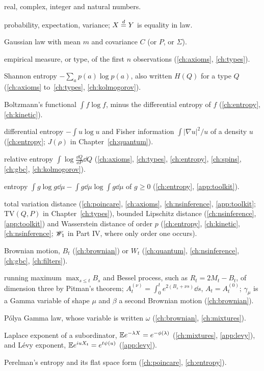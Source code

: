 \begin{description}[leftmargin=2.2em,labelwidth=1.8em,labelsep=0.4em,itemsep=0pt,parsep=0pt]
\item[$\R,\C,\Z,\N$] real, complex, integer and natural numbers.
\item[$\P,\E,\Var$] probability, expectation, variance; $X\stackrel{d}{=} Y$ is equality in law.
\item[$N(m,C)$] Gaussian law with mean $m$ and covariance $C$ (or $P$, or $\Sigma$).
\item[$L_n$] empirical measure, or type, of the first $n$ observations (\ref{ch:axioms}, \ref{ch:types}).
\item[$H(p)$] Shannon entropy $-\sum_ap(a)\log p(a)$, also written $H(Q)$ for a type $Q$ (\ref{ch:axioms} to~\ref{ch:types}, \ref{ch:kolmogorov}).
\item[$H(f)$] Boltzmann's functional $\int f\log f$, minus the differential entropy of $f$ (\ref{ch:entropy}, \ref{ch:kinetic}).
\item[$h(u),\ J(u)$] differential entropy $-\int u\log u$ and Fisher information $\int|\nabla u|^2/u$ of a density $u$ (\ref{ch:entropy}; $J(\rho)$ in Chapter~\ref{ch:quantum}).
\item[$\KL(Q\|P)$] relative entropy $\int\log\frac{\dd Q}{\dd P}\dd Q$ (\ref{ch:axioms}, \ref{ch:types}, \ref{ch:entropy}, \ref{ch:spins}, \ref{ch:gbc}, \ref{ch:kolmogorov}).
\item[$\Ent_\mu(g)$] entropy $\int g\log g\dd\mu-\int g\dd\mu\log\int g\dd\mu$ of $g\ge0$ (\ref{ch:entropy}, \ref{app:toolkit}).
\item[$\mathrm{TV},\ d_{BL},\ W_p$] total variation distance (\ref{ch:poincare}, \ref{ch:axioms}, \ref{ch:nsinference}, \ref{app:toolkit}; $\mathrm{TV}(Q,P)$ in Chapter~\ref{ch:types}), bounded Lipschitz distance (\ref{ch:nsinference}, \ref{app:toolkit}) and Wasserstein distance of order $p$ (\ref{ch:entropy}, \ref{ch:kinetic}, \ref{ch:nsinference}; $\mathscr{W}_1$ in Part IV, where only order one occurs).
\item[$B_t,\ W_t$] Brownian motion, $B_t$ (\ref{ch:brownian}) or $W_t$ (\ref{ch:quantum}, \ref{ch:nsinference}, \ref{ch:gbc}, \ref{ch:filters}).
\item[$M_t,\ R_t$] running maximum $\max_{s\le t}B_s$ and Bessel process, such as $R_t=2M_t-B_t$, of dimension three by Pitman's theorem; $A^{(\nu)}_t=\int_0^te^{2(B_s+\nu s)}\dd s$, $A_t=A^{(0)}_t$; $\gamma_\mu$ is a Gamma variable of shape $\mu$ and $\beta$ a second Brownian motion (\ref{ch:brownian}).
\item[$PG(b,c)$] P\'olya Gamma law, whose variable is written $\omega$ (\ref{ch:brownian}, \ref{ch:mixtures}).
\item[$\phi,\ \psi$] Laplace exponent of a subordinator, $\mathbb{E} e^{-\lambda X}=e^{-\phi(\lambda)}$ (\ref{ch:mixtures}, \ref{app:levy}), and L\'evy exponent, $\mathbb{E} e^{iuX_t}=e^{t\psi(u)}$ (\ref{app:levy}).
\item[$\mathcal{W},\ W(\tau)$] Perelman's entropy and its flat space form (\ref{ch:poincare}, \ref{ch:entropy}).
\end{description}

